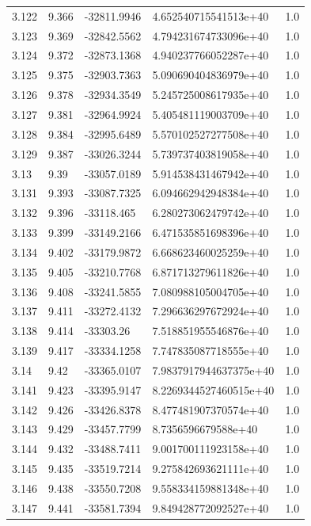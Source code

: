 \begin{tabular}{lllll}
3.122 & 9.366 & -32811.9946 & 4.652540715541513e+40 & 1.0 \\
3.123 & 9.369 & -32842.5562 & 4.794231674733096e+40 & 1.0 \\
3.124 & 9.372 & -32873.1368 & 4.940237766052287e+40 & 1.0 \\
3.125 & 9.375 & -32903.7363 & 5.090690404836979e+40 & 1.0 \\
3.126 & 9.378 & -32934.3549 & 5.245725008617935e+40 & 1.0 \\
3.127 & 9.381 & -32964.9924 & 5.405481119003709e+40 & 1.0 \\
3.128 & 9.384 & -32995.6489 & 5.570102527277508e+40 & 1.0 \\
3.129 & 9.387 & -33026.3244 & 5.739737403819058e+40 & 1.0 \\
3.13 & 9.39 & -33057.0189 & 5.914538431467942e+40 & 1.0 \\
3.131 & 9.393 & -33087.7325 & 6.094662942948384e+40 & 1.0 \\
3.132 & 9.396 & -33118.465 & 6.280273062479742e+40 & 1.0 \\
3.133 & 9.399 & -33149.2166 & 6.471535851698396e+40 & 1.0 \\
3.134 & 9.402 & -33179.9872 & 6.668623460025259e+40 & 1.0 \\
3.135 & 9.405 & -33210.7768 & 6.871713279611826e+40 & 1.0 \\
3.136 & 9.408 & -33241.5855 & 7.080988105004705e+40 & 1.0 \\
3.137 & 9.411 & -33272.4132 & 7.296636297672924e+40 & 1.0 \\
3.138 & 9.414 & -33303.26 & 7.518851955546876e+40 & 1.0 \\
3.139 & 9.417 & -33334.1258 & 7.747835087718555e+40 & 1.0 \\
3.14 & 9.42 & -33365.0107 & 7.9837917944637375e+40 & 1.0 \\
3.141 & 9.423 & -33395.9147 & 8.2269344527460515e+40 & 1.0 \\
3.142 & 9.426 & -33426.8378 & 8.477481907370574e+40 & 1.0 \\
3.143 & 9.429 & -33457.7799 & 8.7356596679588e+40 & 1.0 \\
3.144 & 9.432 & -33488.7411 & 9.001700111923158e+40 & 1.0 \\
3.145 & 9.435 & -33519.7214 & 9.275842693621111e+40 & 1.0 \\
3.146 & 9.438 & -33550.7208 & 9.558334159881348e+40 & 1.0 \\
3.147 & 9.441 & -33581.7394 & 9.849428772092527e+40 & 1.0 \\

\end{tabular}
